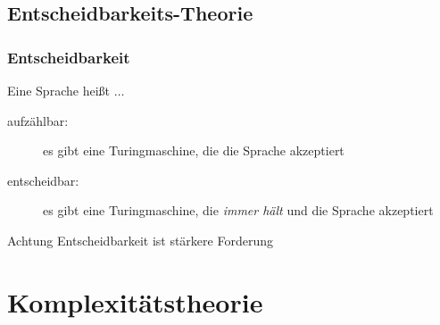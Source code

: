 \subsection{Entscheidbarkeits-Theorie}
\begin{frame}
	\frametitle{Entscheidbarkeit}
	\begin{exampleblock}{}
    Eine Sprache heißt $\dots$
		\begin{description}
			\item[aufzählbar:] es gibt eine Turingmaschine, die die Sprache akzeptiert
			\item [entscheidbar:] es gibt eine Turingmaschine, die \emph{immer hält} und die Sprache akzeptiert
		\end{description}
	\end{exampleblock}
	\begin{alertblock}{Achtung}
		Entscheidbarkeit ist stärkere Forderung
	\end{alertblock}
\end{frame}

\section{Komplexitätstheorie}
